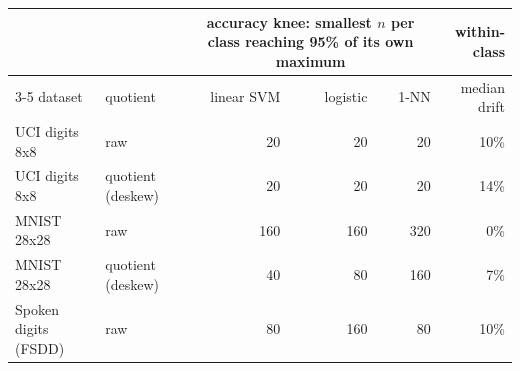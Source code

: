 \begin{tabular}{llrrrr}
\toprule
& & \multicolumn{3}{c}{accuracy knee: smallest $n$ per class reaching 95\% of its own maximum} & within-class \\
\cmidrule(lr){3-5}
dataset & quotient & linear SVM & logistic & 1-NN & median drift \\
\midrule
UCI digits 8x8 & raw & 20 & 20 & 20 & 10\% \\
UCI digits 8x8 & quotient (deskew) & 20 & 20 & 20 & 14\% \\
MNIST 28x28 & raw & 160 & 160 & 320 & 0\% \\
MNIST 28x28 & quotient (deskew) & 40 & 80 & 160 & 7\% \\
Spoken digits (FSDD) & raw & 80 & 160 & 80 & 10\% \\
\bottomrule
\end{tabular}

